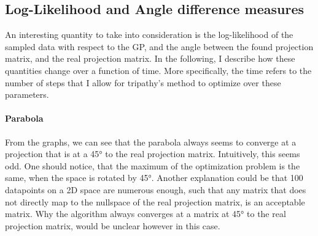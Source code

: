 \subsection{Log-Likelihood and Angle difference measures}

An interesting quantity to take into consideration is the log-likelihood of the sampled data with respect to the GP, and the angle between the found projection matrix, and the real projection matrix.
In the following, I describe how these quantities change over a function of time.
More specifically, the time refers to the number of steps that I allow for tripathy's method to optimize over these parameters.

\paragraph{Parabola}

From the graphs, we can see that the parabola always seems to converge at a projection that is at a 45° to the real projection matrix. 
Intuitively, this seems odd.
One should notice, that the maximum of the optimization problem is the same, when the space is rotated by 45°.
Another explanation could be that 100 datapoints on a 2D space are numerous enough, such that any matrix that does not directly map to the nullspace of the real projection matrix, is an acceptable matrix.
Why the algorithm always converges at a matrix at 45° to the real projection matrix, would be unclear however in this case.

